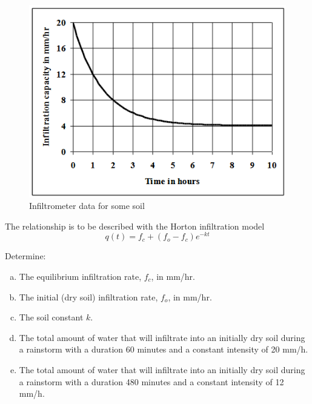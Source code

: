 \documentclass[12pt]{article}
\begin{document}
\begin{enumerate}
\begin{figure}[h!] %
   \centering
   \includegraphics[width=5in]{INFIL.png} 
   \caption{Infiltrometer data for some soil}
   \label{fig:INFIL}
\end{figure}

The relationship is to be described with the Horton infiltration model 
\begin{equation}
q(t)=f_c+(f_o-f_c)e^{-kt}
\end{equation}

Determine:
    \begin{enumerate}[a)]
        \item The equilibrium infiltration rate, $f_c$, in mm/hr.
        \item The initial (dry soil) infiltration rate, $f_o$, in mm/hr.
        \item The soil constant $k$.
        \item The total amount of water that will infiltrate into an initially dry soil during a rainstorm with a duration 60 minutes and a constant intensity of 20 mm/h.
        \item The total amount of water that will infiltrate into an initially dry soil during a rainstorm with a duration 480 minutes and a constant intensity of 12 mm/h.
    \end{enumerate}

\end{enumerate}
\end{document}
